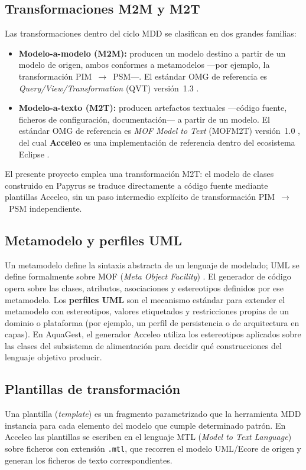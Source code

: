 \documentclass[11pt,a4paper]{article}
\begin{document}
\subsection{Transformaciones M2M y M2T}
Las transformaciones dentro del ciclo MDD se clasifican en dos grandes familias:
\begin{itemize}[nosep]
  \item \textbf{Modelo-a-modelo (M2M):} producen un modelo destino a partir de un modelo de origen,
        ambos conformes a metamodelos —por ejemplo, la transformación PIM~$\rightarrow$~PSM—.
        El estándar OMG de referencia es \textit{Query/View/Transformation} (QVT) versión~1.3
        \cite{omg2016qvt}.
  \item \textbf{Modelo-a-texto (M2T):} producen artefactos textuales —código fuente, ficheros de
        configuración, documentación— a partir de un modelo. El estándar OMG de referencia es
        \textit{MOF Model to Text} (MOFM2T) versión~1.0 \cite{omg2008mofm2t}, del cual
        \textbf{Acceleo} es una implementación de referencia dentro del ecosistema Eclipse
        \cite{eclipseacceleo}.
\end{itemize}
El presente proyecto emplea una transformación M2T: el modelo de clases construido en Papyrus se
traduce directamente a código fuente mediante plantillas Acceleo, sin un paso intermedio explícito de
transformación PIM~$\rightarrow$~PSM independiente.

\subsection{Metamodelo y perfiles UML}
Un metamodelo define la sintaxis abstracta de un lenguaje de modelado; UML se define formalmente
sobre MOF (\textit{Meta Object Facility}) \cite{omg2017uml}. El generador de código opera sobre las
clases, atributos, asociaciones y estereotipos definidos por ese metamodelo. Los \textbf{perfiles UML}
son el mecanismo estándar para extender el metamodelo con estereotipos, valores etiquetados y
restricciones propias de un dominio o plataforma (por ejemplo, un perfil de persistencia o de
arquitectura en capas). En AquaGest, el generador Acceleo utiliza los estereotipos aplicados sobre las
clases del subsistema de alimentación para decidir qué construcciones del lenguaje objetivo producir.

\subsection{Plantillas de transformación}
Una plantilla (\textit{template}) es un fragmento parametrizado que la herramienta MDD instancia
para cada elemento del modelo que cumple determinado patrón. En Acceleo las plantillas se escriben
en el lenguaje MTL (\textit{Model to Text Language}) sobre ficheros con extensión \texttt{.mtl}, que
recorren el modelo UML/Ecore de origen y generan los ficheros de texto correspondientes.
\end{document}
